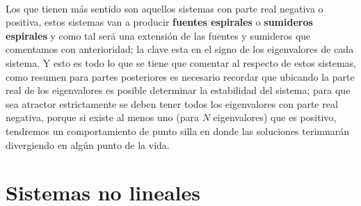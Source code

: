 \documentclass[11pt,a4paper]{article}
\begin{document}
\\
Los que tienen más sentido son aquellos sistemas con parte real negativa o positiva, estos sistemas van a producir \textbf{fuentes espirales} o \textbf{sumideros espirales} y como tal será una extensión de las fuentes y sumideros que comentamos con anterioridad; la clave esta en el signo de los eigenvalores de cada sistema. Y esto es todo lo que se tiene que comentar al respecto de estos sistemas, como resumen para partes posteriores es necesario recordar que ubicando la parte real de los eigenvalores es posible determinar la estabilidad del sistema; para que sea atractor estrictamente se deben tener todos los eigenvalores con parte real negativa, porque si existe al menos uno (para $N$ eigenvalores) que es positivo, tendremos un comportamiento de punto silla en donde las soluciones terimnarán divergiendo en algún punto de la vida.

\section{Sistemas no lineales}
\end{document}
